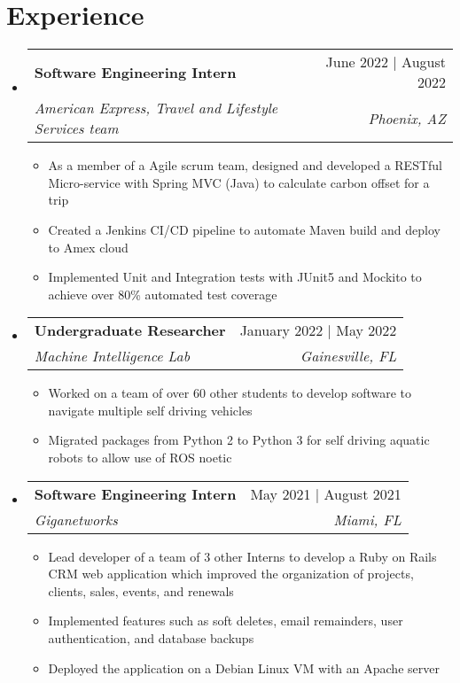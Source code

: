 \documentclass[letterpaper,11pt]{article}
\makeatletter
\newcommand{\resumeItem}[1]{
  \item\small{
    {#1 \vspace{-2pt}}
  }
}
\newcommand{\resumeSubheading}[4]{
  \vspace{-2pt}\item
    \begin{tabular*}{0.97\textwidth}[t]{l@{\extracolsep{\fill}}r}
      \textbf{#1} & #2 \\
      \textit{\small#3} & \textit{\small #4} \\
    \end{tabular*}\vspace{-7pt}
}
\newcommand{\resumeSubHeadingListStart}{\begin{itemize}[leftmargin=0.15in, label={}]}
\newcommand{\resumeSubHeadingListEnd}{\end{itemize}\vspace{-12pt}}
\newcommand{\resumeItemListStart}{\begin{itemize}}
\newcommand{\resumeItemListEnd}{\end{itemize}\vspace{-5pt}}
\makeatother
\begin{document}

\section{Experience}
  \resumeSubHeadingListStart


    \resumeSubheading
      {Software Engineering Intern}{June 2022 | August 2022}
      {American Express, Travel and Lifestyle Services team}{Phoenix, AZ}
      \resumeItemListStart
        \resumeItem{As a member of a Agile scrum team, designed and developed a RESTful Micro-service with Spring MVC (Java) to calculate carbon offset for a trip}
        \resumeItem{Created a Jenkins CI/CD pipeline to automate Maven build and deploy to Amex cloud}
        \resumeItem{ Implemented Unit and Integration
            tests with JUnit5 and Mockito to achieve over 80\% automated test coverage }
      \resumeItemListEnd
      
      \resumeSubheading
      {Undergraduate Researcher}{January 2022 | May 2022}
      {Machine Intelligence Lab}{Gainesville, FL}
      \resumeItemListStart
        \resumeItem {Worked on a team of over 60 other students to develop software to navigate multiple self driving vehicles}
	    \resumeItem {Migrated packages from Python 2 to Python 3 for self driving aquatic robots to allow use of ROS noetic}
      \resumeItemListEnd
      
      \resumeSubheading
      {Software Engineering Intern}{May 2021 | August 2021}
      {Giganetworks}{Miami, FL}
      \resumeItemListStart
        \resumeItem {Lead developer of a team of 3 other Interns to develop a Ruby on Rails CRM web application which improved the organization of projects, clients, sales, events, and renewals}
	    \resumeItem {Implemented features such as soft deletes, email remainders, user authentication, and database backups}
	    \resumeItem { Deployed the application on a Debian Linux VM with an Apache server }
      \resumeItemListEnd
      
      
      
    

  \resumeSubHeadingListEnd


\end{document}
